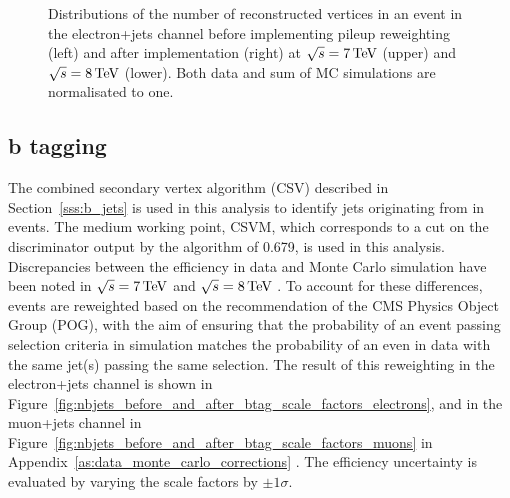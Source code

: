 \begin{figure}[hbtp]
     \caption[Distributions of the number of reconstructed vertices in an event in the electron+jets channel
     before and after implementing pileup reweighting at $\roots=7\TeV$ and $\roots=8\TeV$.]{Distributions of
     the number of reconstructed vertices in an event in the electron+jets channel before implementing pileup
     reweighting (left) and after implementation (right) at $\roots=7\TeV$ (upper) and $\roots=8\TeV$ (lower).
     Both data and sum of MC simulations are normalisated to one.}
     \label{fig:nvertices_before_and_after_pileup_reweighting_electrons}
\end{figure}

\subsection{b tagging}
\label{ss:b_tagging}
The combined secondary vertex \btagging algorithm (CSV) described in Section~\ref{sss:b_jets} is used in this
analysis to identify jets originating from \bquarks in \ttbar events. The medium working point, CSVM, which
corresponds to a cut on the discriminator output by the algorithm of 0.679, is used in this analysis.
Discrepancies between the \btagging efficiency in data and Monte Carlo simulation have been noted in
$\roots=7\TeV$ \cite{CMS-PAS-BTV-11-004} and $\roots=8\TeV$ \cite{CMS-DP-2013-005}. To account for these
differences, events are reweighted based on the recommendation of the CMS \btagging Physics Object Group
(POG), with the aim of ensuring that the probability of an event passing selection criteria in simulation
matches the probability of an even in data with the same jet(s) passing the same selection. The result of this
reweighting in the electron+jets channel is shown in
Figure~\ref{fig:nbjets_before_and_after_btag_scale_factors_electrons}, and in the muon+jets channel in
Figure~\ref{fig:nbjets_before_and_after_btag_scale_factors_muons} in
Appendix~\ref{as:data_monte_carlo_corrections} .
The \btagging efficiency uncertainty is evaluated by varying the scale factors by $\pm1\sigma$.

